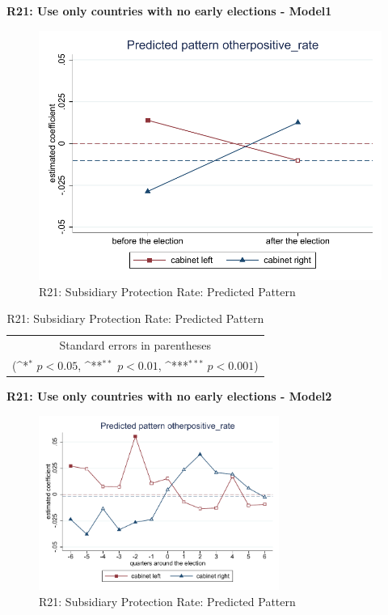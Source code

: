 \documentclass[10pt,a4paper]{scrartcl}
\begin{document}
\clearpage
\textbf{R21: Use only countries with no early elections - Model1}
\begin{figure}[!ht]
	\centering
	\includegraphics[width=1\textwidth]{figures_edited/otherpositive_rate_graph1_R21.pdf}
	\caption{R21: Subsidiary Protection Rate: Predicted Pattern}
\end{figure}

\begin{table}[!ht]\centering
	\renewcommand{\arraystretch}{1.25}
	\def\sym#1{\ifmmode^{#1}\else\(^{#1}\)\fi}
	\caption{R21: Subsidiary Protection Rate: Predicted Pattern}
	\begin{tabular}{l*{2}{c}}
		\hline\hline
		
		\hline\hline
		\multicolumn{3}{c}{\footnotesize Standard errors in parentheses} \\
		\multicolumn{3}{c}{\footnotesize (\sym{*} \(p<0.05\), \sym{**} \(p<0.01\), \sym{***} \(p<0.001\))}\\
	\end{tabular}
\end{table}

\clearpage
\textbf{R21: Use only countries with no early elections - Model2}
\begin{figure}[!ht]
	\centering
	\includegraphics[width=0.7\textwidth]{figures_edited/otherpositive_rate_graph2_R21.pdf}
	\caption{R21: Subsidiary Protection Rate: Predicted Pattern}
\end{figure}
\end{document}
